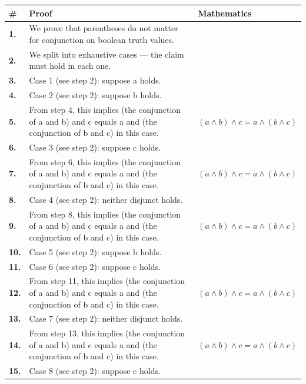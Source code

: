 \documentclass[11pt]{article}
\theoremstyle{definition}
\begin{document}
\begin{tabular}{@{} >{\raggedright\arraybackslash}p{} >{\raggedright\arraybackslash}p{} >{\raggedleft\arraybackslash}p{} @{}}
\textbf{\#} & \textbf{Proof} & \textbf{Mathematics} \\
\midrule
\textbf{1.} & We prove that parentheses do not matter for conjunction on boolean truth values. & \\[0.45em]
\textbf{2.} & We split into exhaustive cases — the claim must hold in each one. & \\[0.45em]
\textbf{3.} & Case 1 (see step 2): suppose a holds. & \\[0.45em]
\textbf{4.} & Case 2 (see step 2): suppose b holds. & \\[0.45em]
\textbf{5.} & From step 4, this implies (the conjunction of a and b) and c equals a and (the conjunction of b and c) in this case. & $\displaystyle (a \land b) \land c = a \land (b \land c)$ \\[0.45em]
\textbf{6.} & Case 3 (see step 2): suppose c holds. & \\[0.45em]
\textbf{7.} & From step 6, this implies (the conjunction of a and b) and c equals a and (the conjunction of b and c) in this case. & $\displaystyle (a \land b) \land c = a \land (b \land c)$ \\[0.45em]
\textbf{8.} & Case 4 (see step 2): neither disjunct holds. & \\[0.45em]
\textbf{9.} & From step 8, this implies (the conjunction of a and b) and c equals a and (the conjunction of b and c) in this case. & $\displaystyle (a \land b) \land c = a \land (b \land c)$ \\[0.45em]
\textbf{10.} & Case 5 (see step 2): suppose b holds. & \\[0.45em]
\textbf{11.} & Case 6 (see step 2): suppose c holds. & \\[0.45em]
\textbf{12.} & From step 11, this implies (the conjunction of a and b) and c equals a and (the conjunction of b and c) in this case. & $\displaystyle (a \land b) \land c = a \land (b \land c)$ \\[0.45em]
\textbf{13.} & Case 7 (see step 2): neither disjunct holds. & \\[0.45em]
\textbf{14.} & From step 13, this implies (the conjunction of a and b) and c equals a and (the conjunction of b and c) in this case. & $\displaystyle (a \land b) \land c = a \land (b \land c)$ \\[0.45em]
\textbf{15.} & Case 8 (see step 2): suppose c holds. & \\[0.45em]

\end{tabular}
\end{document}
